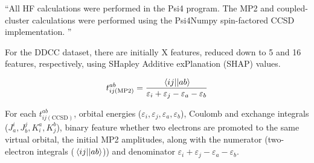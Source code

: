\documentclass[journal=jacsat,manuscript=article]{achemso}
\begin{document}
``All HF calculations were performed in the Psi4 \cite{parrish_psi4_2017} program. The MP2 and coupled-cluster calculations were performed using the Psi4Numpy \cite{smith_psi4numpy_2018} spin-factored CCSD implementation. \cite{stanton_direct_1991}''


For the DDCC dataset, there are initially X features, reduced down to 5 and 16 features, respectively, using SHapley Additive exPlanation (SHAP) values.\cite{lundberg_unified_2017} 


\begin{equation}
	t^{ab}_{ij(\text{MP2})} = \frac{\mel{ij}{}{ab}}{\varepsilon_{i}+\varepsilon_{j}-\varepsilon_{a}-\varepsilon_{b}}
	\label{eq:MP2_t2}
\end{equation}

For each $t^{ab}_{ij(\text{CCSD})}$, orbital energies ($\varepsilon_{i},\varepsilon_{j},\varepsilon_{a},\varepsilon_{b}$), Coulomb and exchange integrals ($J^{i}_{a},J^{j}_{b},K^{a}_{i},K^{b}_{j}$), binary feature whether two electrons are promoted to the same virtual orbital, the initial MP2 amplitudes, along with the numerator (two-electron integrals ($\mel{ij}{}{ab}$)) and denominator $\varepsilon_{i}+\varepsilon_{j}-\varepsilon_{a}-\varepsilon_{b}$.
\end{document}
